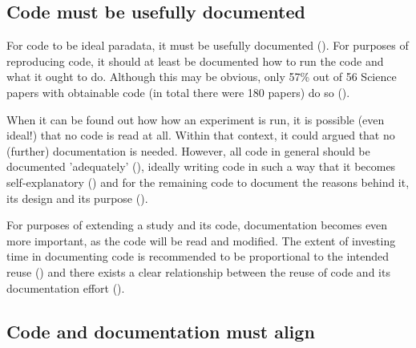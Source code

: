 \subsection{Code must be usefully documented}

For code to be ideal paradata, it must be usefully 
documented (\cite{huvila2022improving}).
For purposes of reproducing code,
it should at least be documented how to run the code and what it ought to do.
Although this may be obvious, only 57\% out of 56 Science papers 
with obtainable code (in total there were 180 papers) 
do so (\cite{stodden2018empirical}).

When it can be found out how how an experiment is run, 
it is possible (even ideal!) that no code is read at all.
Within that context, it could argued that no (further) documentation is needed.
However, all code in general should be documented 
'adequately' (\cite{peng2006reproducible}),
ideally writing code in such a way that it becomes 
self-explanatory (\cite{wilson2014best})
and for the remaining code to document the reasons behind it, 
its design and its purpose (\cite{wilson2014best}).

For purposes of extending a study and its code, 
documentation becomes even more important,
as the code will be read and modified.
The extent of investing time in documenting code is recommended
to be proportional to the intended reuse (\cite{pianosi2020successfully})
and there exists a clear relationship between the reuse 
of code and its documentation 
effort (\cite{cosentino2017systematic,hata2015characteristics}).

\subsection{Code and documentation must align}

